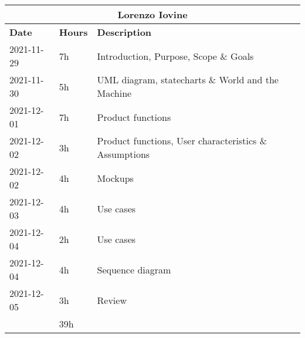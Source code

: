 \begin{table}[H]
    \centering
    \begin{tabular}{|l|l|l|}
        \multicolumn{3}{c}{\textbf{Lorenzo Iovine}}                   \\
        \hline
        \textbf{Date} & \textbf{Hours} & \textbf{Description}          \\\hline
        2021-11-29    & 7h             & Introduction, Purpose, Scope \& Goals                  \\\hline
        2021-11-30    & 5h             & UML diagram, statecharts \& World and the Machine      \\\hline
        2021-12-01    & 7h             & Product functions                                      \\\hline
        2021-12-02    & 3h             & Product functions, User characteristics \& Assumptions \\\hline
        2021-12-02    & 4h             & Mockups                                                \\\hline
        2021-12-03    & 4h             & Use cases                                              \\\hline
        2021-12-04    & 2h             & Use cases                                              \\\hline
        2021-12-04    & 4h             & Sequence diagram                                       \\\hline
        2021-12-05    & 3h             & Review                                                 \\\hline\hline
                      & 39h            &                                                        \\\hline
    \end{tabular}
\end{table}
